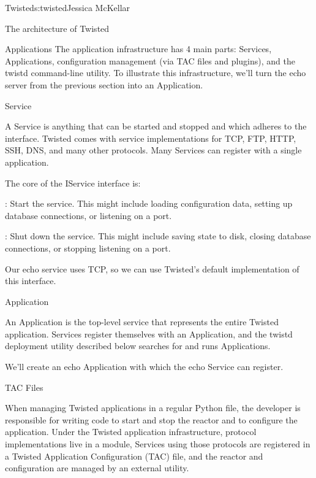 \begin{aosachapter}{Twisted}{s:twisted}{Jessica McKellar}
\begin{aosasect1}{The architecture of Twisted}
\begin{aosasect2}{Applications}
The application infrastructure has 4 main parts: Services, Applications,
configuration management (via TAC files and plugins), and the twistd
command-line utility. To illustrate this infrastructure, we'll turn the echo
server from the previous section into an Application.

\begin{aosasect3}{Service}

A Service is anything that can be started and stopped and which adheres to
the  interface. Twisted comes with service implementations
for TCP, FTP, HTTP, SSH, DNS, and many other protocols. Many Services can
register with a single application.

The core of the IService interface is:

\begin{aosaitemize}

\item {}: Start the service. This might include
  loading configuration data, setting up database connections, or
  listening on a port.

\item {}: Shut down the service. This might include
  saving state to disk, closing database connections, or stopping
  listening on a port.

\end{aosaitemize}

Our echo service uses TCP, so we can use Twisted's default
 implementation of this 
interface.

\end{aosasect3}

\begin{aosasect3}{Application}

An Application is the top-level service that represents the entire Twisted
application. Services register themselves with an Application, and the twistd
deployment utility described below searches for and runs Applications.

We'll create an echo Application with which the echo Service can
register.

\end{aosasect3}

\begin{aosasect3}{TAC Files}

When managing Twisted applications in a regular Python file, the developer is
responsible for writing code to start and stop the reactor and to configure the
application. Under the Twisted application infrastructure, protocol
implementations live in a module, Services using those protocols are registered
in a Twisted Application Configuration (TAC) file, and the reactor and
configuration are managed by an external utility.


\end{aosasect3}
\end{aosasect2}
\end{aosasect1}
\end{aosachapter}
